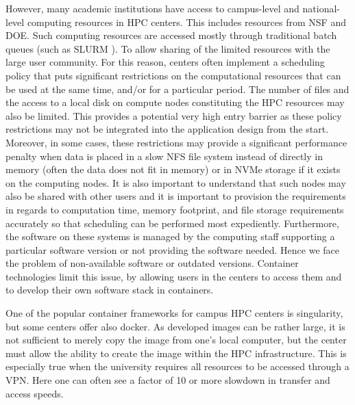\documentclass[utf8]{FrontiersinVancouver} %
\begin{document}
However, many academic institutions have access to campus-level and
national-level computing resources in HPC centers.  This includes
resources from NSF and DOE. Such computing resources are accessed
mostly through traditional batch queues (such as SLURM
\citep{www-slurm}).  To allow sharing of the limited resources with
the large user community. For this reason, centers often implement a
scheduling policy that puts significant restrictions on the
computational resources that can be used at the same time, and/or for
a particular period. The number of files and the access to a local
disk on compute nodes constituting the HPC resources may also be
limited.  This provides a potential very high entry barrier as these
policy restrictions may not be integrated into the application design
from the start.  Moreover, in some cases, these restrictions may
provide a significant performance penalty when data is placed in a
slow NFS file system instead of directly in memory (often the data
does not fit in memory) or in NVMe storage if it exists on the
computing nodes.  It is also important to understand that such nodes
may also be shared with other users and it is important to provision
the requirements in regards to computation time, memory footprint, and
file storage requirements accurately so that scheduling can be
performed most expediently.  Furthermore, the software on these
systems is managed by the computing staff supporting a particular
software version or not providing the software needed. Hence we face
the problem of non-available software or outdated versions. Container
technologies limit this issue, by allowing users in the centers to
access them and to develop their own software stack in containers.
 

One of the popular container frameworks for campus HPC centers is
singularity, but some centers offer also docker. As developed images
can be rather large, it is not sufficient to merely copy the image from
one's local computer, but the center must allow the ability to create
the image within the HPC infrastructure. This is especially true when
the university requires all resources to be accessed through a
VPN. Here one can often see a factor of 10 or more slowdown in
transfer and access speeds.
\end{document}
